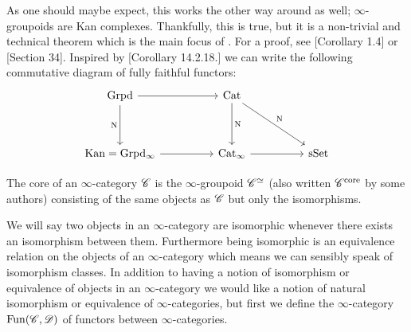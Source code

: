 \documentclass[../../thesis.tex]{subfiles}
\begin{document}
As one should maybe expect, this works the other way around as well; $\infty$-groupoids are Kan complexes.
Thankfully, this is true, but it is a non-trivial and technical theorem which is the main focus of \cite{Joyal}.
For a proof, see \cite{Joyal}[Corollary 1.4] or \cite{Rezk}[Section 34].
Inspired by \cite{Groth}[Corollary 14.2.18.] we can write the following commutative diagram of fully faithful functors:
\[\begin{tikzcd}
        {\mathrm{Grpd}} && {\mathrm{Cat}} \\
        \\
        {\mathrm{Kan}=\mathrm{Grpd_{\infty}}} && {\mathrm{Cat}_{\infty}} && \sset
        \arrow[from=1-1, to=1-3]
        \arrow["\Nerve"', from=1-1, to=3-1]
        \arrow[from=3-1, to=3-3]
        \arrow["\Nerve", from=1-3, to=3-3]
        \arrow[from=3-3, to=3-5]
        \arrow["\Nerve", from=1-3, to=3-5]
    \end{tikzcd}\]
\begin{definition}
    The core of an $\infty$-category $\mathscr{C}$ is the $\infty$-groupoid $\mathscr{C}^{\simeq}$ (also written $\mathscr{C}^{\text{core}}$ by some authors) consisting of the same objects as $\mathscr{C}$ but only the isomorphisms.
\end{definition}
We will say two objects in an $\infty$-category are isomorphic whenever there exists an isomorphism between them.
Furthermore being isomorphic is an equivalence relation on the objects of an $\infty$-category which means we can sensibly speak of isomorphism classes.
In addition to having a notion of isomorphism or equivalence of objects in an $\infty$-category we would like a notion of natural isomorphism or equivalence of $\infty$-categories, but first we define the $\infty$-category $\mathrm{Fun}(\mathscr{C}, \mathscr{D})$ of functors between $\infty$-categories.
\end{document}
